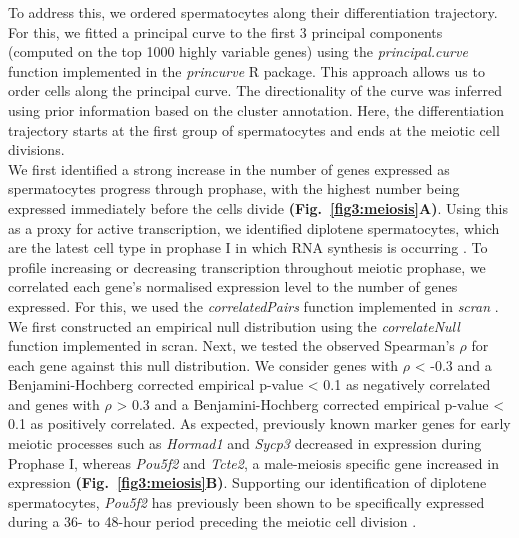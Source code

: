 To address this, we ordered spermatocytes along their differentiation trajectory. For this, we fitted a principal curve \citep{Hastie1989} to the first 3 principal components (computed on the top 1000 highly variable genes) using the \emph{principal.curve} function implemented in the \emph{princurve} R package. This approach allows us to order cells along the principal curve. The directionality of the curve was inferred using prior information based on the cluster annotation. Here, the differentiation trajectory starts at the first group of spermatocytes and ends at the meiotic cell divisions. \\
We first identified a strong increase in the number of genes expressed as spermatocytes progress through prophase, with the highest number being expressed immediately before the cells divide \textbf{(Fig.~\ref{fig3:meiosis}A)}. Using this as a proxy for active transcription, we identified diplotene spermatocytes, which are the latest cell type in prophase I in which RNA synthesis is occurring \citep{Monesi1965}. To profile increasing or decreasing transcription throughout meiotic prophase, we correlated each gene’s normalised expression level to the number of genes expressed. For this, we used the \emph{correlatedPairs} function implemented in \emph{scran} \citep{Lun2016}. We first constructed an empirical null distribution using the \emph{correlateNull} function implemented in scran. Next, we tested the observed Spearman’s $\rho$ for each gene against this null distribution.  We consider genes with $\rho$ < -0.3 and a Benjamini-Hochberg corrected empirical p-value < 0.1 as negatively correlated and genes with $\rho$ > 0.3 and a Benjamini-Hochberg corrected empirical p-value < 0.1 as positively correlated. As expected, previously known marker genes for early meiotic processes such as \textit{Hormad1} and \textit{Sycp3} decreased in expression during Prophase I, whereas \textit{Pou5f2} and \textit{Tcte2}, a male-meiosis specific gene \citep{Braidotti1997} increased in expression \textbf{(Fig.~\ref{fig3:meiosis}B)}. Supporting our identification of diplotene spermatocytes, \textit{Pou5f2} has previously been shown to be specifically expressed during a 36- to 48-hour period preceding the meiotic cell division \citep{Andersen1993}. \\

\newpage

